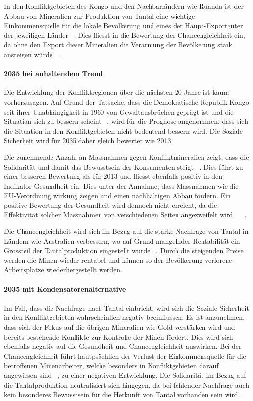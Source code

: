 In den Konfliktgebieten des Kongo und den Nachbarländern wie Ruanda ist der Abbau von 
Mineralien zur Produktion von Tantal eine wichtige Einkommensquelle für die lokale Bevölkerung
und eines der Haupt-Exportgüter der jeweiligen Länder ~\cite{OECProdu81}. Dies fliesst in
die Bewertung der Chancengleichheit ein, da ohne den Export dieser Mineralien die Verarmung
der Bevölkerung stark ansteigen würde ~\cite{DRCongo35}.

\paragraph{2035 bei anhaltendem Trend} Die Entwicklung der Konfliktregionen über die nächsten 20 Jahre
ist kaum vorherzusagen. Auf Grund der Tatsache, dass die Demokratische Republik Kongo seit ihrer Unabhängigkeit
in 1960 von Gewaltausbrüchen geprägt ist und die Situation sich zu bessern scheint ~\cite{Demokrat2}, wird für die 
Prognose angenommen, dass sich die Situation in den Konfliktgebieten nicht bedeutend bessern wird.
Die Soziale Sicherheit wird für 2035 daher gleich bewertet wie 2013. 

Die zunehmende Anzahl an Massnahmen gegen Konfliktmineralien zeigt, dass die Solidarität und damit das Bewusstsein
der Konsumenten steigt ~\cite{Didthere42}. Dies führt zu einer besseren Bewertung als für 2013 und fliesst ebenfalls
positiv in den Indikator Gesundheit ein. Dies unter der Annahme, dass Massnahmen wie die EU-Verordnung wirkung zeigen und
einen nachhaltigen Abbau fördern. Ein positive Bewertung der Gesundheit wird dennoch nicht erreicht, da die Effektivität
solcher Massnahmen von verschiedenen Seiten angezweifelt wird ~\cite{Demokrat2} ~\cite{TheEUCon25}. 

Die Chancengleichheit wird sich im Bezug auf die starke Nachfrage von Tantal in Ländern wie
Australien verbessern, wo auf Grund mangelnder Rentabilität ein Grossteil der Tantalproduktion  
eingestellt wurde ~\cite{Tantalum12}. Durch die steigenden Preise werden die Minen wieder rentabel und 
können so der Bevölkerung verlorene Arbeitsplätze wiederhergestellt werden.  

\paragraph{2035 mit Kondensatorenalternative} Im Fall, dass die Nachfrage nach Tantal einbricht, wird sich die
Soziale Sicherheit in den Konfliktgebieten wahrscheinlich negativ beeinflussen. Es ist anzunehmen, dass sich der
Fokus auf die übrigen Mineralien wie Gold verstärken wird und bereits bestehende Konflikte zur Kontrolle der 
Minen fördert. Dies wird sich ebenfalls negativ auf die Gesundheit und Chancengleichheit auswirken. Bei der 
Chancengleichheit führt hautpsächlich der Verlust der Einkommensquelle für die betroffenen Minenarbeiter, welche
besonders in Konfliktgebieten darauf angewiesen sind ~\cite{Obamasc19}, zu einer negativen Entwicklung. 
Die Solidarität im Bezug auf die Tantalproduktion neutralisiert sich hingegen, da bei fehlender Nachfrage auch 
kein besonderes Bewusstsein für die Herkunft von Tantal vorhanden sein wird.  

